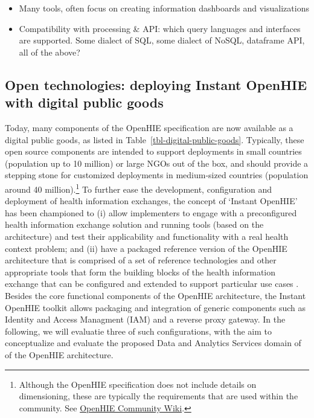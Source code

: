 \documentclass[
  authoryear]{elsarticle}
\providecommand{\tightlist}{%
  \setlength{\itemsep}{0pt}\setlength{\parskip}{0pt}}\usepackage{longtable,booktabs,array}
\begin{document}
\begin{itemize}
\tightlist
\item
  Many tools, often focus on creating information dashboards and
  visualizations
\item
  Compatibility with processing \& API: which query languages and
  interfaces are supported. Some dialect of SQL, some dialect of NoSQL,
  dataframe API, all of the above?
\end{itemize}

\subsection{Open technologies: deploying Instant OpenHIE with digital
public
goods}\label{open-technologies-deploying-instant-openhie-with-digital-public-goods}

Today, many components of the OpenHIE specification are now available as
a digital public goods, as listed in
Table~\ref{tbl-digital-public-goods}. Typically, these open source
components are intended to support deployments in small countries
(population up to 10 million) or large NGOs out of the box, and should
provide a stepping stone for customized deployments in medium-sized
countries (population around 40 million).\footnote{Although the OpenHIE
  specification does not include details on dimensioning, these are
  typically the requirements that are used within the community. See
  \href{https://wiki.ohie.org/display/CP/Interoperability+Layer+-+Use+Cases+and+Requirements}{OpenHIE
  Community Wiki}.} To further ease the development, configuration and
deployment of health information exchanges, the concept of `Instant
OpenHIE' has been championed to (i) allow implementers to engage with a
preconfigured health information exchange solution and running tools
(based on the architecture) and test their applicability and
functionality with a real health context problem; and (ii) have a
packaged reference version of the OpenHIE architecture that is comprised
of a set of reference technologies and other appropriate tools that form
the building blocks of the health information exchange that can be
configured and extended to support particular use cases
\citep{InstantOpenHIEv2}. Besides the core functional components of the
OpenHIE architecture, the Instant OpenHIE toolkit allows packaging and
integration of generic components such as Identity and Access Managment
(IAM) and a reverse proxy gateway. In the following, we will evaluatie
three of such configurations, with the aim to conceptualize and evaluate
the proposed Data and Analytics Services domain of of the OpenHIE
architecture.
\end{document}
